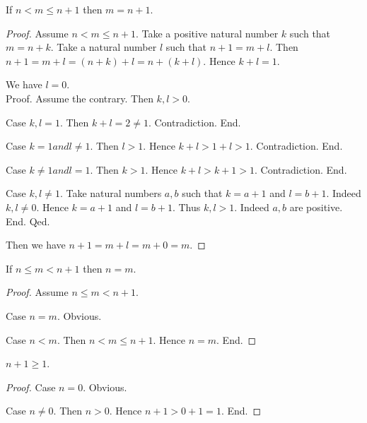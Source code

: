 \documentclass[../../arithmetic.ftl.tex]{subfiles}
\begin{document}
  \begin{forthel}
    \begin{proposition}\label{Arithmetic_02_01_203608}
      If $n < m \leq n + 1$ then $m = n + 1$.
    \end{proposition}
    \begin{proof}
      Assume $n < m \leq n + 1$.
      Take a positive natural number $k$ such that $m = n + k$.
      Take a natural number $l$ such that $n + 1 = m + l$.
      Then $n + 1 = m + l = (n + k) + l = n + (k + l)$.
      Hence $k + l = 1$.

      We have $l = 0$. \\
      Proof.
        Assume the contrary.
        Then $k,l > 0$.

        Case $k,l = 1$.
          Then $k + l = 2 \neq 1$.
          Contradiction.
        End.

        Case $k = 1 and l \neq 1$.
          Then $l > 1$.
          Hence $k + l > 1 + l > 1$.
          Contradiction.
        End.

        Case $k \neq 1 and l = 1$.
          Then $k > 1$.
          Hence $k + l > k + 1 > 1$.
          Contradiction.
        End.

        Case $k,l \neq 1$.
          Take natural numbers $a,b$ such that $k = a + 1$ and $l = b + 1$.
          Indeed $k,l \neq 0$.
          Hence $k = a + 1$ and $l = b + 1$.
          Thus $k,l > 1$. Indeed $a,b$ are positive.
        End.
      Qed.

      Then we have $n + 1 = m + l = m + 0 = m$.
    \end{proof}


    \begin{proposition}\label{Arithmetic_02_01_126729}
      If $n \leq m < n + 1$ then $n = m$.
    \end{proposition}
    \begin{proof}
      Assume $n \leq m < n + 1$.

      Case $n = m$. Obvious.

      Case $n < m$.
        Then $n < m \leq n + 1$.
        Hence $n = m$.
      End.
    \end{proof}


    \begin{proposition}\label{Arithmetic_02_01_408119}
      $n + 1 \geq 1$.
    \end{proposition}
    \begin{proof}
      Case $n = 0$. Obvious.

      Case $n \neq 0$.
        Then $n > 0$.
        Hence $n + 1 > 0 + 1 = 1$.
      End.
    \end{proof}
  \end{forthel}
\end{document}
